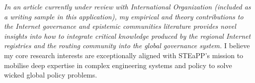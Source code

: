 \documentclass[11pt]{letter}
\begin{document}
\begin{letter}
%
%
%
%
\emph{In an article currently under review with International Organization (included as a writing sample in this application), my empirical and theory contributions to the Internet governance and epistemic communities literature provides novel insights into how to integrate critical knowledge produced by  the regional Internet registries and the routing community into the global governance system. 
%
}
%
%
I believe my core research interests are exceptionally aligned with STEaPP's mission to mobilise deep expertise in complex engineering systems and policy to solve wicked global policy problems.


\end{letter}
\end{document}
